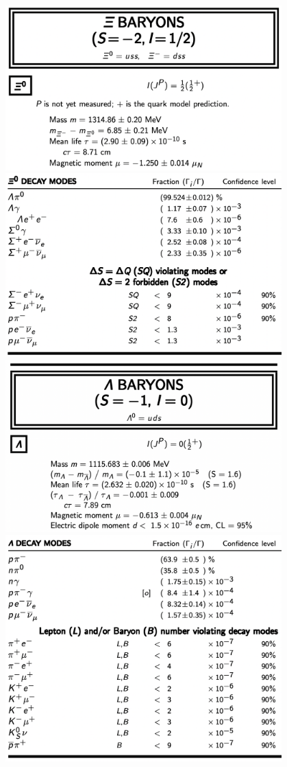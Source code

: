\begin{center}
\includegraphics[width=0.8\textwidth]{PDG/XI_BARYONS.png}
\includegraphics[width=0.8\textwidth]{PDG/XI_DECAY_MODES.png}
\includegraphics[width=0.8\textwidth]{PDG/LAMBDA_BARYONS.png}
\includegraphics[width=0.8\textwidth]{PDG/LAMBDA_DECAY_MODES.png}
\end{center}
